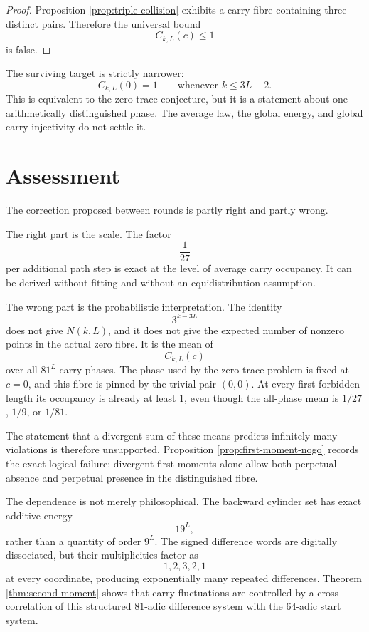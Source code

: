 \documentclass[11pt]{article}
\theoremstyle{remark}
\begin{document}
\begin{proof}
Proposition \ref{prop:triple-collision} exhibits a carry fibre containing three distinct pairs.  Therefore the universal bound
\[
C_{k,L}(c)\le1
\]
is false.
\end{proof}

The surviving target is strictly narrower:
\[
C_{k,L}(0)=1
\qquad
\text{whenever }
k\le3L-2.
\]
This is equivalent to the zero-trace conjecture, but it is a statement about one arithmetically distinguished phase.  The average law, the global energy, and global carry injectivity do not settle it.

\section{Assessment}

The correction proposed between rounds is partly right and partly wrong.

The right part is the scale.  The factor
\[
\frac1{27}
\]
per additional path step is exact at the level of average carry occupancy.  It can be derived without fitting and without an equidistribution assumption.

The wrong part is the probabilistic interpretation.  The identity
\[
3^{k-3L}
\]
does not give \(N(k,L)\), and it does not give the expected number of nonzero points in the actual zero fibre.  It is the mean of
\[
C_{k,L}(c)
\]
over all \(81^L\) carry phases.  The phase used by the zero-trace problem is fixed at \(c=0\), and this fibre is pinned by the trivial pair \((0,0)\).  At every first-forbidden length its occupancy is already at least \(1\), even though the all-phase mean is \(1/27\), \(1/9\), or \(1/81\).

The statement that a divergent sum of these means predicts infinitely many violations is therefore unsupported.  Proposition \ref{prop:first-moment-nogo} records the exact logical failure: divergent first moments alone allow both perpetual absence and perpetual presence in the distinguished fibre.

The dependence is not merely philosophical.  The backward cylinder set has exact additive energy
\[
19^L,
\]
rather than a quantity of order \(9^L\).  The signed difference words are digitally dissociated, but their multiplicities factor as
\[
1,2,3,2,1
\]
at every coordinate, producing exponentially many repeated differences.  Theorem \ref{thm:second-moment} shows that carry fluctuations are controlled by a cross-correlation of this structured \(81\)-adic difference system with the \(64\)-adic start system.
\end{document}
